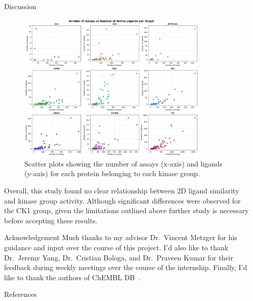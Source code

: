 \documentclass[final]{beamer}
\newlength{\sepwidth}
\newlength{\colwidth}
\newcommand{\separatorcolumn}{\begin{column}{\sepwidth}\end{column}}
\begin{document}
\begin{frame}[t]
\begin{columns}[t]
\begin{column}{\colwidth}
\begin{block}{Discussion}
    \begin{figure}
        \centering
        \includegraphics[width=0.85\textwidth]{../figures/assay_vs_ligand.png}
        \caption{Scatter plots showing the number of assays (x-axis) and ligands (y-axis) for each protein belonging to each kinase group.}
        \label{assay_vs_ligand_plot}
    \end{figure}

      \small
      Overall, this study found no clear relationship between 2D ligand similarity and kinase group activity. Although significant differences were observed for the CK1 group, given the limitations outlined above further study is necessary before accepting these results. 
  \end{block}

  \begin{block}{Acknowledgement}
  \small{
    Much thanks to my advisor Dr.~Vincent Metzger for his guidance and input over the course of this project. I'd also like to thank Dr.~Jeremy Yang, Dr.~Cristian Bologa, and Dr.~Praveen Kumar for their feedback during weekly meetings over the course of the internship. Finally, I'd like to thank the   authors of ChEMBL DB~\cite{chembl_db_2023}.}
  \end{block}

  \begin{block}{References}
    \tiny{}
  \end{block}

\end{column}

\separatorcolumn
\end{columns}
\end{frame}
\end{document}
